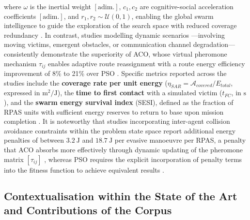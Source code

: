 where $\omega$ is the inertial weight $[\text{adim.}]$, $c_1, c_2$ are cognitive-social acceleration coefficients $[\text{adim.}]$, and $r_1, r_2 \sim \mathcal{U}(0,1)$, enabling the global swarm intelligence to guide the exploration of the search space with reduced coverage redundancy \cite{liu2021cassa, ntakolia2021}. In contrast, studies modelling dynamic scenarios —involving moving victims, emergent obstacles, or communication channel degradation— consistently demonstrate the superiority of ACO, whose virtual pheromone mechanism $\tau_{ij}$ enables adaptive route reassignment with a route energy efficiency improvement of 8\% to 21\% over PSO \cite{phung2021, yu2021, chu2022, ji2022, selma2022, shafiq2022, ahmed2021}. Specific metrics reported across the studies include the \textbf{coverage rate per unit energy} ($\eta_{SAR} = \mathcal{A}_{covered} / E_{total}$, expressed in $\text{m}^2/\text{J}$), the \textbf{time to first contact} with a simulated victim ($t_{FC}$, in $\text{s}$), and the \textbf{swarm energy survival index} (SESI), defined as the fraction of RPAS units with sufficient energy reserves to return to base upon mission completion \cite{liu2021disaster, chu2022, xu2022}. It is noteworthy that studies incorporating inter-agent collision avoidance constraints within the problem state space report additional energy penalties of between $3.2\ \text{J}$ and $18.7\ \text{J}$ per evasive manoeuvre per RPAS, a penalty that ACO absorbs more effectively through dynamic updating of the pheromone matrix $[\tau_{ij}]$ \cite{ji2022, shafiq2022}, whereas PSO requires the explicit incorporation of penalty terms into the fitness function to achieve equivalent results \cite{liu2021, pan2022}.

\subsection{Contextualisation within the State of the Art and Contributions of the Corpus}

